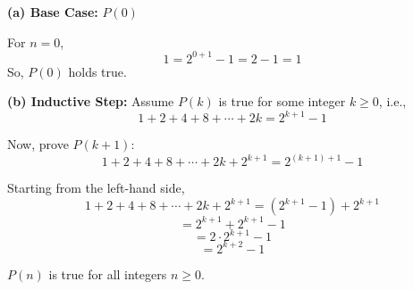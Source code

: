 \documentclass{article}
\begin{document}
\textbf{(a) Base Case:} $P(0)$

For $n = 0$,
\[ 1 = 2^{0+1} - 1 = 2 - 1 = 1 \]
So, $P(0)$ holds true.

\textbf{(b) Inductive Step:} Assume $P(k)$ is true for some integer $k \geq 0$, i.e.,
\[ 1 + 2 + 4 + 8 + \cdots + 2k = 2^{k+1} - 1 \]

Now, prove $P(k+1)$:
\[ 1 + 2 + 4 + 8 + \cdots + 2k + 2^{k+1} = 2^{(k+1)+1} - 1 \]

Starting from the left-hand side,
\[ 1 + 2 + 4 + 8 + \cdots + 2k + 2^{k+1} = (2^{k+1} - 1) + 2^{k+1} \]
\[ = 2^{k+1} + 2^{k+1} - 1 \]
\[ = 2 \cdot 2^{k+1} - 1 \]
\[ = 2^{k+2} - 1 \]

$P(n)$ is true for all integers $n \geq 0$.
\end{document}
